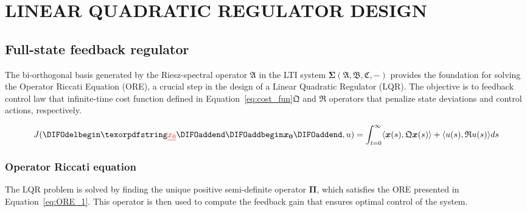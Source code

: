 \section{LINEAR QUADRATIC REGULATOR DESIGN} \label{sec:control}

\subsection{Full-state feedback regulator} \label{sec:fullstate_design}

The bi-orthogonal basis generated by the Riesz-spectral operator $\mathfrak{A}$ in the LTI system $\mathbf{\Sigma(\mathfrak{A},\mathfrak{B},\mathfrak{C},-)}$ provides the foundation for solving the Operator Riccati Equation (ORE), a crucial step in the design of a Linear Quadratic Regulator (LQR). The objective is to \DIFdelbegin {}\DIFdelend \DIFaddbegin {}\DIFaddend feedback control law that \DIFdelbegin {}\DIFdelend \DIFaddbegin {}\DIFaddend infinite-time cost function \DIFdelbegin {}\DIFdelend defined in Equation~\ref{eq:cost_fun}\DIFdelbegin {}\DIFdelend \DIFaddbegin {}\DIFaddend $\mathfrak{Q}$ and $\mathfrak{R}$ \DIFdelbegin {}\DIFdelend \DIFaddbegin {}\DIFaddend operators that penalize state deviations and control actions, respectively.

\begin{equation} \label{eq:cost_fun}
    J(\DIFdelbegin \DIFdel{x_0}\DIFdelend \DIFaddbegin \bm{x_0}\DIFaddend , u) = \int_{t=0}^{\infty} \langle \bm{x}(s), \mathfrak{Q} \bm{x}(s)\rangle + \langle u(s), \mathfrak{R} u(s)\rangle ds
\end{equation}

\subsubsection{Operator Riccati equation}

The LQR problem is solved by finding the unique positive semi-definite operator $\mathbf{\Pi}$, which satisfies the ORE presented in Equation~\ref{eq:ORE_1}. This operator is then used to compute the feedback gain that ensures optimal control of the system.

